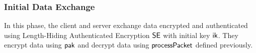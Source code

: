 \subsubsection{Initial Data Exchange}
In this phase, the client and server exchange data
encrypted and authenticated using Length-Hiding
Authenticated Encryption $\mathsf{SE}$ with initial key $\mathsf{ik}$.
They encrypt data using $\mathsf{pak}$ and decrypt data using
$\mathsf{processPacket}$ defined previously.